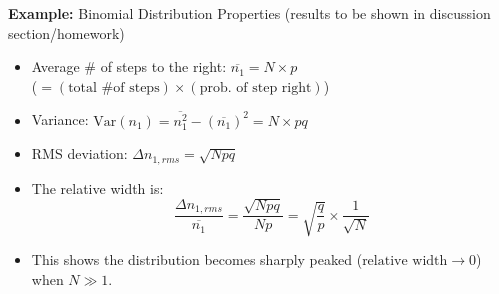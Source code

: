 \documentclass[11pt]{article}
\newcommand{\avg}[1]{\overline{#1}}
\begin{document}
\textbf{Example:} Binomial Distribution Properties (results to be shown in discussion section/homework)
\begin{itemize}
    \item Average \# of steps to the right: $\avg{n_1} = N \times p$ \\
    ($= (\text{total \# of steps}) \times (\text{prob. of step right})$)
    \item Variance: $\text{Var}(n_1) = \avg{n_1^2} - (\avg{n_1})^2 = N \times p q$
    \item RMS deviation: $\Delta n_{1, rms} = \sqrt{N p q}$
    \item The relative width is:
    \[ \frac{\Delta n_{1, rms}}{\avg{n_1}} = \frac{\sqrt{Npq}}{Np} = \sqrt{\frac{q}{p}} \times \frac{1}{\sqrt{N}} \]
    \item This shows the distribution becomes sharply peaked ($\text{relative width} \to 0$) when $N \gg 1$.
\end{itemize}
\end{document}

